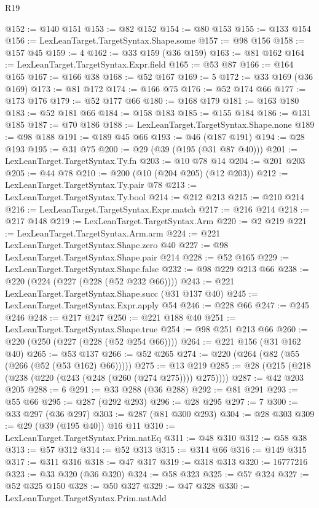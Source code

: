 \begin{lexlean}{R19}
\begin{coremodule}
@152 := @140 @151
@153 := @82 @152
@154 := @80 @153
@155 := @133 @154
@156 := LexLeanTarget.TargetSyntax.Shape.some
@157 := @98 @156
@158 := @157 @45
@159 := 4
@162 := @33 @159 (@36 @159)
@163 := @81 @162
@164 := LexLeanTarget.TargetSyntax.Expr.field
@165 := @53 @87
@166 := @164 @165
@167 := @166 @38
@168 := @52 @167
@169 := 5
@172 := @33 @169 (@36 @169)
@173 := @81 @172
@174 := @166 @75
@176 := @52 @174 @66
@177 := @173 @176
@179 := @52 @177 @66
@180 := @168 @179
@181 := @163 @180
@183 := @52 @181 @66
@184 := @158 @183
@185 := @155 @184
@186 := @131 @185
@187 := @70 @186
@188 := LexLeanTarget.TargetSyntax.Shape.none
@189 := @98 @188
@191 := @189 @45 @66
@193 := @46 (@187 @191)
@194 := @28 @193
@195 := @31 @75
@200 := @29 (@39 (@195 (@31 @87 @40)))
@201 := LexLeanTarget.TargetSyntax.Ty.fn
@203 := @10 @78 @14
@204 := @201 @203
@205 := @44 @78
@210 := @200 (@10 (@204 @205) (@12 @203))
@212 := LexLeanTarget.TargetSyntax.Ty.pair @78
@213 := LexLeanTarget.TargetSyntax.Ty.bool
@214 := @212 @213
@215 := @210 @214
@216 := LexLeanTarget.TargetSyntax.Expr.match
@217 := @216 @214
@218 := @217 @148
@219 := LexLeanTarget.TargetSyntax.Arm
@220 := @2 @219
@221 := LexLeanTarget.TargetSyntax.Arm.arm
@224 := @221 LexLeanTarget.TargetSyntax.Shape.zero @40
@227 := @98 LexLeanTarget.TargetSyntax.Shape.pair @214
@228 := @52 @165
@229 := LexLeanTarget.TargetSyntax.Shape.false
@232 := @98 @229 @213 @66
@238 := @220 (@224 (@227 (@228 (@52 @232 @66))))
@243 := @221 LexLeanTarget.TargetSyntax.Shape.succ (@31 @137 @40)
@245 := LexLeanTarget.TargetSyntax.Expr.apply @54
@246 := @228 @66
@247 := @245 @246
@248 := @217 @247
@250 := @221 @188 @40
@251 := LexLeanTarget.TargetSyntax.Shape.true
@254 := @98 @251 @213 @66
@260 := @220 (@250 (@227 (@228 (@52 @254 @66))))
@264 := @221 @156 (@31 @162 @40)
@265 := @53 @137
@266 := @52 @265
@274 := @220 (@264 (@82 (@55 (@266 (@52 (@53 @162) @66)))))
@275 := @13 @219
@285 := @28 (@215 (@218 (@238 (@220 (@243 (@248 (@260 (@274 @275)))) @275))))
@287 := @42 @203 @205
@288 := 6
@291 := @33 @288 (@36 @288)
@292 := @81 @291
@293 := @55 @66
@295 := @287 (@292 @293)
@296 := @28 @295
@297 := 7
@300 := @33 @297 (@36 @297)
@303 := @287 (@81 @300 @293)
@304 := @28 @303
@309 := @29 (@39 (@195 @40)) @16 @11
@310 := LexLeanTarget.TargetSyntax.Prim.natEq
@311 := @48 @310
@312 := @58 @38
@313 := @57 @312
@314 := @52 @313
@315 := @314 @66
@316 := @149 @315
@317 := @311 @316
@318 := @47 @317
@319 := @318 @313
@320 := 16777216
@323 := @33 @320 (@36 @320)
@324 := @58 @323
@325 := @57 @324
@327 := @52 @325 @150
@328 := @50 @327
@329 := @47 @328
@330 := LexLeanTarget.TargetSyntax.Prim.natAdd

\end{coremodule}
\end{lexlean}
